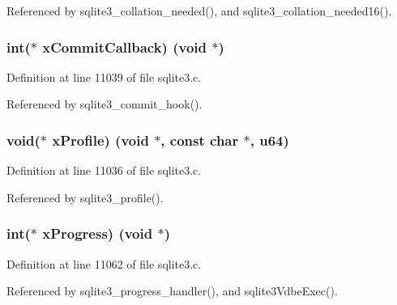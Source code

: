 Referenced by sqlite3\+\_\+collation\+\_\+needed(), and sqlite3\+\_\+collation\+\_\+needed16().

\hypertarget{structsqlite3_a4e8bad45f834070578c17b7bca681c59}{}
\subsubsection[{x\+Commit\+Callback}]{\setlength{\rightskip}{0pt plus 5cm}int($\ast$ x\+Commit\+Callback) (void $\ast$)}\label{structsqlite3_a4e8bad45f834070578c17b7bca681c59}


Definition at line 11039 of file sqlite3.\+c.



Referenced by sqlite3\+\_\+commit\+\_\+hook().

\hypertarget{structsqlite3_a04b4f4fb5f8692b699a35fbf8d4448f7}{}
\subsubsection[{x\+Profile}]{\setlength{\rightskip}{0pt plus 5cm}void($\ast$ x\+Profile) (void $\ast$, const char $\ast$, {\bf u64})}\label{structsqlite3_a04b4f4fb5f8692b699a35fbf8d4448f7}


Definition at line 11036 of file sqlite3.\+c.



Referenced by sqlite3\+\_\+profile().

\hypertarget{structsqlite3_ab6daeb552d87996383e1a46abfd8afc0}{}
\subsubsection[{x\+Progress}]{\setlength{\rightskip}{0pt plus 5cm}int($\ast$ x\+Progress) (void $\ast$)}\label{structsqlite3_ab6daeb552d87996383e1a46abfd8afc0}


Definition at line 11062 of file sqlite3.\+c.



Referenced by sqlite3\+\_\+progress\+\_\+handler(), and sqlite3\+Vdbe\+Exec().

\hypertarget{structsqlite3_aa214b2f14d2b0d62e8eca478cc693272}{}
